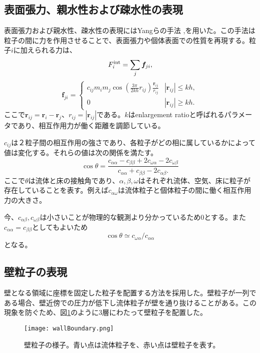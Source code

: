 \documentclass[]{jsarticle}
\begin{document}
\subsection{表面張力、親水性および疎水性の表現}
表面張力および親水性、疎水性の表現にはYangらの手法 \cite{Yang2016},\cite{Yang2017}を用いた。この手法は粒子の間に力を作用させることで、表面張力や個体表面での性質を再現する。粒子$i$に加えられる力は、
\begin{equation}
F^{\rm{int}}_i=\sum_{j} \bm{f}_{ji},
\end{equation}
\begin{equation}
  \bm{f}_{ji}=\begin{cases}
    c_{ij}m_im_j\cos\left(\frac{3\pi}{2kh}r_{ij}\right)\frac{\bm{r}_{ij}}{r_{ij}} & \text{$|\bm{r}_{ij}|\leq kh,$}\\
    0 & \text{$|\bm{r}_{ij}|\geq kh.$}
\end{cases}
\end{equation}
ここで$\bm{r}_{ij}=\bm{r}_i-\bm{r}_{j}$、$r_{ij}=|\bm{r}_{ij}|$である。$k$はenlargement ratioと呼ばれるパラメータであり、相互作用力が働く距離を調節している。

$c_{ij}$は２粒子間の相互作用の強さであり、各粒子がどの相に属しているかによって値は変化する。それらの値は次の関係を満たす。
\begin{equation}
\cos\theta=\frac{c_{\alpha\alpha}-c_{\beta\beta}+2c_{\omega\alpha}-2c_{\omega\beta}}{c_{\alpha\alpha} +c_{\beta\beta} -2c_{\alpha\beta}.}
\end{equation}
ここで$\theta$は流体と床の接触角であり、$\alpha,\beta,\omega$はそれぞれ流体、空気、床に粒子が存在していることを表す。例えば$c_{\alpha\omega}$は流体粒子と個体粒子の間に働く相互作用力の大きさ。

今、$c_{\alpha\beta},c_{\omega\beta}$は小さいことが物理的な観測より分かっているため0とする。また$c_{\alpha\alpha}=c_{\beta\beta}$としてもよいため
\begin{equation}
\label{eqn:contactAngleSimplified}
  \cos\theta\simeq c_{\omega\alpha}/c_{\alpha\alpha}
\end{equation}
となる。

\subsection{壁粒子の表現}
壁となる領域に座標を固定した粒子を配置する方法を採用した。壁粒子が一列である場合、壁近傍での圧力が低下し流体粒子が壁を通り抜けることがある。この現象を防ぐため、図\ref{fig:wallParticles}のように3層にわたって壁粒子を配置した。
\begin{figure}[H]
  \centering
  \texttt{[image: wallBoundary.png]}
  \caption{壁粒子の様子。青い点は流体粒子を、赤い点は壁粒子を表す。}
  \label{fig:wallParticles} 
\end{figure}
\end{document}
